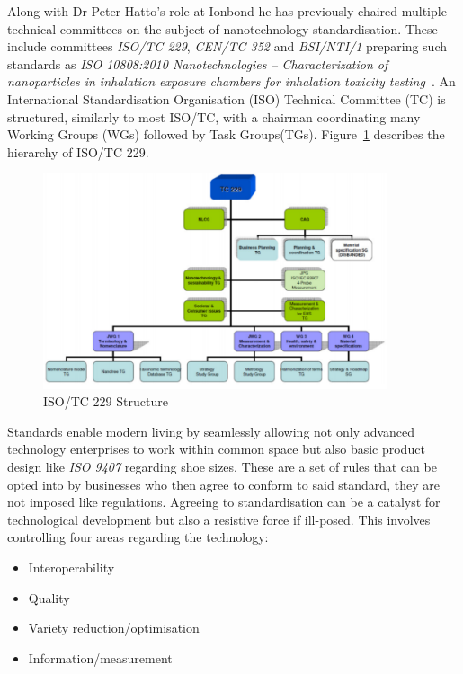 
{}

Along with Dr Peter Hatto's role at Ionbond he has previously chaired multiple technical committees on the subject of nanotechnology standardisation.
These include committees \emph{ISO/TC 229}, \emph{CEN/TC 352} and \emph{BSI/NTI/1} preparing such standards as \emph{ISO 10808:2010 Nanotechnologies -- Characterization of nanoparticles in inhalation exposure chambers for inhalation toxicity testing}~\cite{iso10808}.
An International Standardisation Organisation (ISO) Technical Committee (TC) is structured, similarly to most ISO/TC, with a chairman coordinating many Working Groups (WGs) followed by Task Groups(TGs).
Figure~\ref{figure:tc229} describes the hierarchy of ISO/TC 229. 

\begin{figure}[!h]
\centering
\includegraphics[width = 0.9\textwidth]{Figures/TC229.pdf}
\caption{ISO/TC 229 Structure \cite{isotc229}}
\label{figure:tc229}
\end{figure}

Standards enable modern living by seamlessly allowing not only advanced technology enterprises to work within common space but also basic product design like \emph{ISO 9407} regarding shoe sizes.
These are a set of rules that can be opted into by businesses who then agree to conform to said standard, they are not imposed like regulations.
Agreeing to standardisation can be a catalyst for technological development but also a resistive force if ill-posed.  
This involves controlling four areas regarding the technology:

\begin{itemize}
	\item Interoperability
	\item Quality
	\item Variety reduction/optimisation
	\item Information/measurement
\end{itemize}


